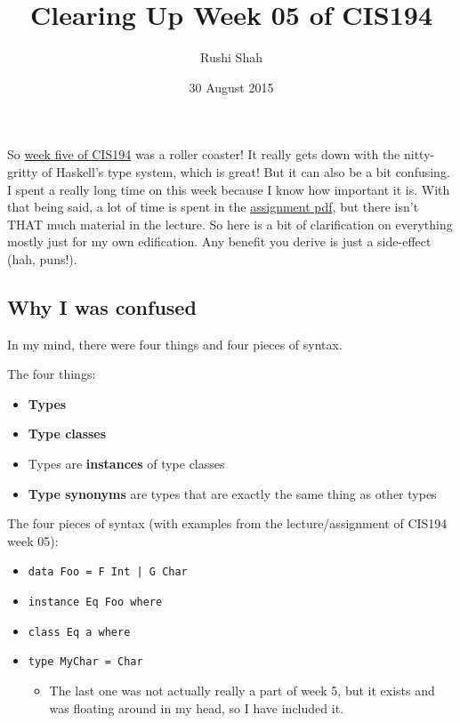 \documentclass[12pt]{article}
\title{Clearing Up Week 05 of CIS194}
\author{Rushi Shah}
\date{30 August 2015}
\newcommand{\tightlist}{\setlength{\itemsep}{0pt}\setlength{\parskip}{0pt}}
\begin{document}
  \maketitle

So \href{http://www.seas.upenn.edu/~cis194/spring13/lectures/05-type-classes.html}{week
five of CIS194} was a roller coaster! It really gets down with the
nitty-gritty of Haskell's type system, which is great! But it can also
be a bit confusing. I spent a really long time on this week because I
know how important it is. With that being said, a lot of time is spent
in the
\href{http://www.seas.upenn.edu/~cis194/spring13/hw/05-type-classes.pdf}{assignment
pdf}, but there isn't THAT much material in the lecture. So here is a
bit of clarification on everything mostly just for my own edification.
Any benefit you derive is just a side-effect (hah, puns!).

\subsection{Why I was confused}\label{why-i-was-confused}

In my mind, there were four things and four pieces of syntax.

The four things:

\begin{itemize}
\tightlist
\item
  \textbf{Types}
\item
  \textbf{Type classes}
\item
  Types are \textbf{instances} of type classes
\item
  \textbf{Type synonyms} are types that are exactly the same thing as
  other types
\end{itemize}

The four pieces of syntax (with examples from the lecture/assignment of
CIS194 week 05):

\begin{itemize}
\tightlist
\item
  \texttt{data\ Foo\ =\ F\ Int\ |\ G\ Char}
\item
  \texttt{instance\ Eq\ Foo\ where}
\item
  \texttt{class\ Eq\ a\ where}
\item
  \texttt{type\ MyChar\ =\ Char}
  \begin{itemize}
    \tightlist
    \item
      The last one was not actually really a part of week 5, but it exists and was
      floating around in my head, so I have included it.
  \end{itemize}
\end{itemize}
\end{document}
